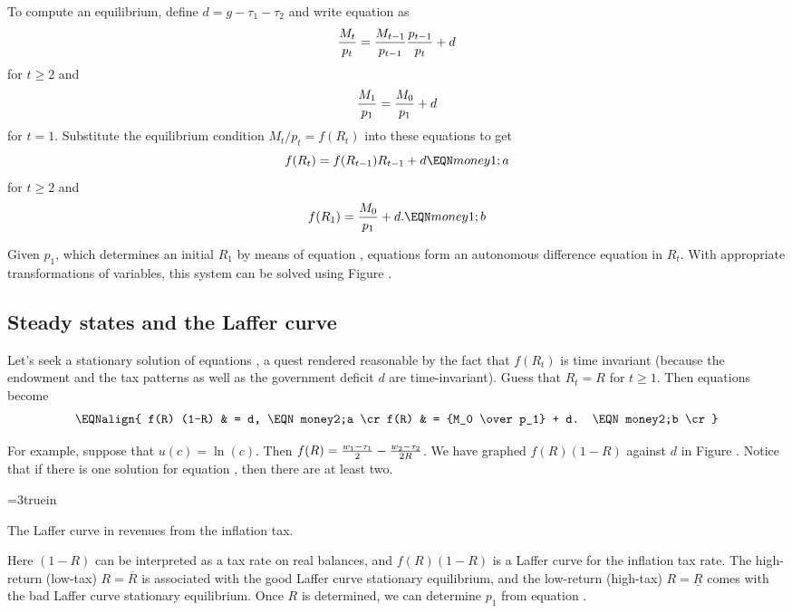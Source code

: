    To compute an equilibrium, define $d = g- \tau_1 - \tau_2$ and
write equation  as
$$ {M_t \over  p_t} = {M_{t-1} \over p_{t-1} }  {p_{t-1} \over p_t}
     + d  $$
for $t \geq 2$
and $$ {M_1 \over p_1} = {M_0 \over p_1} + d $$
for $t=1$.
Substitute the equilibrium condition $M_t / p_t = f(R_t)$ into these equations to
get
$$ f(R_t) = f(R_{t-1})R_{t-1} + d  \EQN money1;a $$
for $t\geq 2$ and
$$ f(R_1) =  {M_0 \over p_1} + d. \EQN money1;b $$


 Given $p_1$, which determines an initial
$R_1$ by means of equation
, equations  form an autonomous
difference equation in $R_t$.    With appropriate transformations of variables, this system can be
solved using Figure . %


\subsection{Steady states and the Laffer curve}

Let's seek a stationary solution of equations  , a quest
 rendered reasonable by the fact that $f(R_t)$ is time
invariant (because the endowment and the
tax patterns as well as the government deficit
$d$  are time-invariant).     Guess that $R_t = R$ for
$t \geq 1$.  Then equations  become
$$\EQNalign{ f(R) (1-R) & = d, \EQN money2;a \cr
             f(R) &  = {M_0   \over p_1}  + d. \EQN money2;b \cr} $$

For example, suppose that $u(c) = \ln(c)$.  Then
$ f(R) = {w_1 - \tau_1 \over 2} - {w_2 - \tau_2 \over 2 R}$.  We
have graphed $f(R)(1-R)$ against $d$ in Figure . %
Notice that if there is one solution for equation ,  then there
are at least two.


\centerline{\epsfxsize=3truein}
\caption{The Laffer curve in revenues from the inflation tax.}
\endfigure

  Here $(1-R)$ can be interpreted as  a tax rate on  real
balances, and $f(R)(1-R)$ is a Laffer curve for the inflation
tax rate.  The high-return (low-tax) $R = \overline R$
 is associated with
the good Laffer curve stationary equilibrium, and
the low-return (high-tax) $R = \underline R$ comes with the bad
Laffer curve stationary
equilibrium.  Once $R$ is determined, we can determine
$p_1$ from equation .

